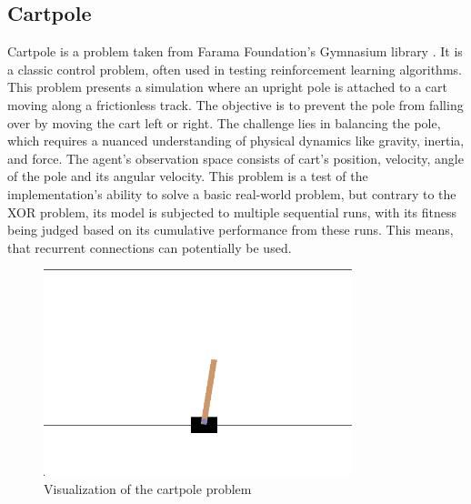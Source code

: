 \documentclass{article}
\begin{document}
        \subsection{Cartpole}
        Cartpole is a problem taken from Farama Foundation's Gymnasium library \cite{gymnasium}. It is a classic control problem,
        often used in testing reinforcement learning algorithms.
        This problem presents a simulation where an upright pole is attached to a cart moving along a frictionless track.
        The objective is to prevent the pole from falling over by moving the cart left or right.
        The challenge lies in balancing the pole,
        which requires a nuanced understanding of physical dynamics like gravity, inertia, and force.
        The agent's observation space consists of cart's 
        position, velocity, angle of the pole and its angular velocity.
        This problem is a test of the implementation's ability to solve a basic real-world problem, but contrary 
        to the XOR problem, its model is subjected to multiple sequential runs,
        with its fitness being judged based on its cumulative performance from these runs. This means, that
        recurrent connections can potentially be used.
    \begin{figure}[h]
        \centering
        \includegraphics[width=0.8\textwidth]{cartpole.png}
        \caption{Visualization of the cartpole problem}
    \end{figure}
\end{document}
